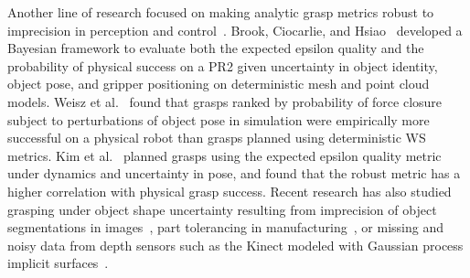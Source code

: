 Another line of research focused on making analytic grasp metrics robust to imprecision in perception and control~\cite{goldberg1990bayesian, stulp2011learning, zheng2005}.
Brook, Ciocarlie, and Hsiao~\cite{brook2011collaborative, hsiao2011bayesian} developed a Bayesian framework to evaluate both the expected epsilon quality and the probability of physical success on a PR2 given uncertainty in object identity, object pose, and gripper positioning on deterministic mesh and point cloud models. 
Weisz et al.~\cite{weisz2012pose} found that grasps ranked by probability of force closure subject to perturbations of object pose in simulation were empirically more successful on a physical robot than grasps planned using deterministic WS metrics. 
Kim et al.~\cite{kim2012physically} planned grasps using the expected epsilon quality metric~\cite{ferrari1992} under dynamics and uncertainty in pose, and found that the robust metric has a higher correlation with physical grasp success.
Recent research has also studied grasping under object shape uncertainty resulting from imprecision of object segmentations in images~\cite{christopoulos2007handling}, part tolerancing in manufacturing~\cite{kehoe2012estimating, kehoe2012toward, panahi2015orienting}, or missing and noisy data from depth sensors such as the Kinect modeled with Gaussian process implicit surfaces~\cite{dragiev2013uncertainty, mahler2015gp, laskey2015bandits}.

